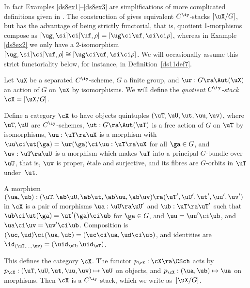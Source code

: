 \documentclass{article}
\begin{document}
In fact Examples \ref{ds8ex1}--\ref{ds8ex3} are simplifications of
more complicated definitions given in \cite[\S 9.1]{Joyc4}. The
construction of \cite[\S 9.1]{Joyc4} gives equivalent $C^\iy$-stacks
$[\uX/G]$, but has the advantage of being strictly functorial, that
is, quotient 1-morphisms compose as
$[\ug,\si]\ci[\uf,\rho]=[\ug\ci\uf, \si\ci\rho]$, whereas in Example
\ref{ds8ex2} we only have a 2-isomorphism
$[\ug,\si]\ci[\uf,\rho]\cong[\ug\ci\uf,\si\ci\rho]$. We will
occasionally assume this strict functoriality below, for instance,
in Definition~\ref{ds11def7}.

\begin{ex} Let $\uX$ be a separated $C^\iy$-scheme, $G$ a finite
group, and $\ur:G\ra\Aut(\uX)$ an action of $G$ on $\uX$ by
isomorphisms. We will define the {\it quotient
$C^\iy$-stack\/}~$\cX=[\uX/G]$.

Define a category $\cX$ to have objects quintuples
$(\uT,\uU,\ut,\uu,\uv)$, where $\uT,\uU$ are $C^\iy$-schemes,
$\ut:G\ra\Aut(\uT)$ is a free action of $G$ on $\uT$ by
isomorphisms, $\uu:\uT\ra\uX$ is a morphism with $\uu\ci\ut(\ga)=
\ur(\ga)\ci\uu:\uT\ra\uX$ for all $\ga\in G$, and $\uv:\uT\ra\uU$ is
a morphism which makes $\uT$ into a principal $G$-bundle over $\uU$,
that is, $\uv$ is proper, \'etale and surjective, and its fibres are
$G$-orbits in $\uT$ under~$\ut$.

A morphism $(\ua,\ub):(\uT,\ab\uU,\ab\ut, \ab\uu,\ab\uv)
\ra(\uT',\uU',\ut',\uu',\uv')$ in $\cX$ is a pair of morphisms
$\ua:\uU\ra\uU'$ and $\ub:\uT\ra\uT'$ such that
$\ub\ci\ut(\ga)=\ut'(\ga)\ci\ub$ for $\ga\in G$, and
$\uu=\uu'\ci\ub$, and $\ua\ci\uv=\uv'\ci\ub$. Composition is
$(\uc,\ud)\ci(\ua,\ub)= (\uc\ci\ua,\ud\ci\ub)$, and identities
are~$\id_{(\uT,\ldots,\uv)}=(\uid_\uU, \uid_\uT)$.

This defines the category $\cX$. The functor $p_\cX:\cX\ra\CSch$
acts by $p_\cX:(\uT,\uU,\ut,\uu,\uv)\mapsto\uU$ on objects, and
$p_\cX:(\ua,\ub)\mapsto\ua$ on morphisms. Then $\cX$ is a
$C^\iy$-stack, which we write as~$[\uX/G]$.
\label{ds8ex1}
\end{ex}
\end{document}
